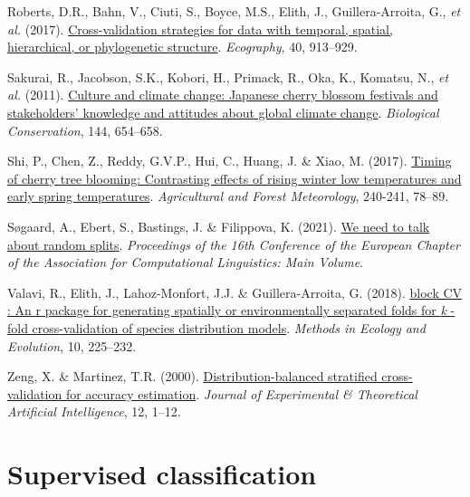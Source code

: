 \documentclass[
  letterpaper,
]{scrbook}
\newlength{\cslhangindent}
\newenvironment{CSLReferences}[2] %
 {\begin{list}{}{%
  \setlength{\itemindent}{0pt}
  \setlength{\leftmargin}{0pt}
  \setlength{\parsep}{0pt}
  \ifodd #1
   \setlength{\leftmargin}{\cslhangindent}
   \setlength{\itemindent}{-1\cslhangindent}
  \fi
  \setlength{\itemsep}{#2\baselineskip}}}
 {\end{list}}
\begin{document}
\begin{CSLReferences}{1}{0}
Roberts, D.R., Bahn, V., Ciuti, S., Boyce, M.S., Elith, J.,
Guillera-Arroita, G., \emph{et al.} (2017).
\href{https://doi.org/10.1111/ecog.02881}{Cross{-}validation strategies
for data with temporal, spatial, hierarchical, or phylogenetic
structure}. \emph{Ecography}, 40, 913--929.

Sakurai, R., Jacobson, S.K., Kobori, H., Primack, R., Oka, K., Komatsu,
N., \emph{et al.} (2011).
\href{https://doi.org/10.1016/j.biocon.2010.09.028}{Culture and climate
change: Japanese cherry blossom festivals and stakeholders{'} knowledge
and attitudes about global climate change}. \emph{Biological
Conservation}, 144, 654--658.

Shi, P., Chen, Z., Reddy, G.V.P., Hui, C., Huang, J. \& Xiao, M. (2017).
\href{https://doi.org/10.1016/j.agrformet.2017.04.001}{Timing of cherry
tree blooming: Contrasting effects of rising winter low temperatures and
early spring temperatures}. \emph{Agricultural and Forest Meteorology},
240-241, 78--89.

Søgaard, A., Ebert, S., Bastings, J. \& Filippova, K. (2021).
\href{https://doi.org/10.18653/v1/2021.eacl-main.156}{We need to talk
about random splits}. \emph{Proceedings of the 16th Conference of the
European Chapter of the Association for Computational Linguistics: Main
Volume}.

Valavi, R., Elith, J., Lahoz-Monfort, J.J. \& Guillera-Arroita, G.
(2018). \href{https://doi.org/10.1111/2041-210x.13107}{block CV : An r
package for generating spatially or environmentally separated folds for
{\emph{k}} {-}fold cross{-}validation of species distribution models}.
\emph{Methods in Ecology and Evolution}, 10, 225--232.

Zeng, X. \& Martinez, T.R. (2000).
\href{https://doi.org/10.1080/095281300146272}{Distribution-balanced
stratified cross-validation for accuracy estimation}. \emph{Journal of
Experimental \& Theoretical Artificial Intelligence}, 12, 1--12.

\end{CSLReferences}


\chapter{Supervised classification}\label{sec-classification}
\end{document}

